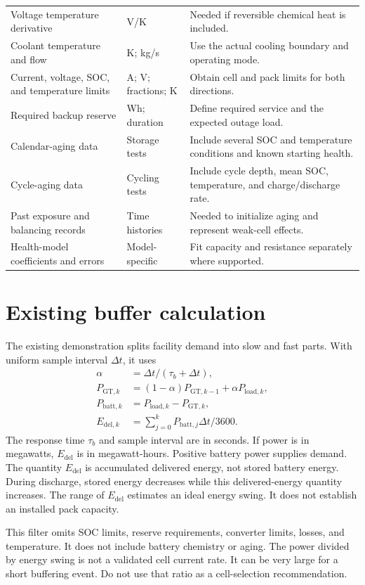 \documentclass[11pt,a4paper]{report}
\begin{document}
\begin{longtable}{L{0.22\textwidth}L{0.17\textwidth}L{0.49\textwidth}}
Voltage temperature derivative & V/K & Needed if reversible chemical heat is included. \\
Coolant temperature and flow & K; kg/s & Use the actual cooling boundary and operating mode. \\
Current, voltage, SOC, and temperature limits & A; V; fractions; K & Obtain cell and pack limits for both directions. \\
Required backup reserve & Wh; duration & Define required service and the expected outage load. \\
Calendar-aging data & Storage tests & Include several SOC and temperature conditions and known starting health. \\
Cycle-aging data & Cycling tests & Include cycle depth, mean SOC, temperature, and charge/discharge rate. \\
Past exposure and balancing records & Time histories & Needed to initialize aging and represent weak-cell effects. \\
Health-model coefficients and errors & Model-specific & Fit capacity and resistance separately where supported. \\
\bottomrule
\end{longtable}

\section{Existing buffer calculation}
The existing demonstration splits facility demand into slow and fast parts.
With uniform sample interval $\Delta t$, it uses
\begin{align}
\alpha&=\Delta t/(\tau_b+\Delta t),\\
P_{\mathrm{GT},k}&=(1-\alpha)P_{\mathrm{GT},k-1}+\alpha P_{\mathrm{load},k},\\
P_{\mathrm{batt},k}&=P_{\mathrm{load},k}-P_{\mathrm{GT},k},\\
E_{\mathrm{del},k}&=\sum_{j=0}^{k}P_{\mathrm{batt},j}\Delta t/3600.
\end{align}
The response time $\tau_b$ and sample interval are in seconds.
If power is in megawatts, $E_{\mathrm{del}}$ is in megawatt-hours.
Positive battery power supplies demand.
The quantity $E_{\mathrm{del}}$ is accumulated delivered energy, not stored battery energy.
During discharge, stored energy decreases while this delivered-energy quantity increases.
The range of $E_{\mathrm{del}}$ estimates an ideal energy swing.
It does not establish an installed pack capacity.

This filter omits SOC limits, reserve requirements, converter limits, losses, and temperature.
It does not include battery chemistry or aging.
The power divided by energy swing is not a validated cell current rate.
It can be very large for a short buffering event.
Do not use that ratio as a cell-selection recommendation.
\end{document}
